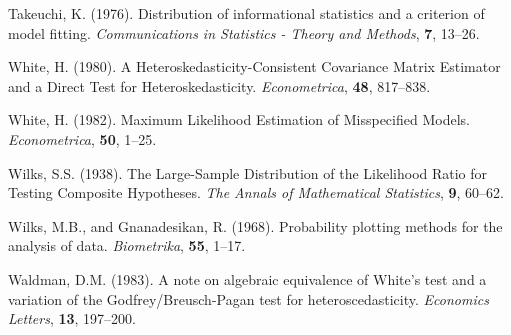 \phantom{a}

\rff Takeuchi, K. (1976).
      Distribution of informational statistics and a criterion of model fitting.
      {\it Communications in Statistics - Theory and Methods},
      {\bf 7}, {13--26}.

\phantom{a}

\rff White, H. (1980).
      A Heteroskedasticity-Consistent Covariance Matrix Estimator and a Direct Test for Heteroskedasticity.
      {\it Econometrica},
      {\bf 48}, {817--838}.

\phantom{a}

\rff White, H. (1982).
      Maximum Likelihood Estimation of Misspecified Models.
      {\it Econometrica},
      {\bf 50}, {1--25}.

\phantom{a}

\rff Wilks, S.S. (1938).
      The Large-Sample Distribution of the Likelihood Ratio for Testing Composite Hypotheses.
      {\it The Annals of Mathematical Statistics},
      {\bf 9}, {60--62}.

\phantom{a}

\rff Wilks, M.B., and Gnanadesikan, R. (1968).
      Probability plotting methods for the analysis of data.
      {\it Biometrika},
      {\bf 55}, {1--17}.

\phantom{a}

\rff Waldman, D.M. (1983).
      A note on algebraic equivalence of White's test and a variation of the Godfrey/Breusch-Pagan test for heteroscedasticity.
      {\it Economics Letters},
      {\bf 13}, {197--200}.

